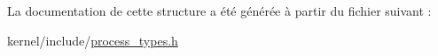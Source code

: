 La documentation de cette structure a été générée à partir du fichier suivant \-:\begin{DoxyCompactItemize}
\item 
kernel/include/\hyperlink{process__types_8h}{process\-\_\-types.\-h}\end{DoxyCompactItemize}
